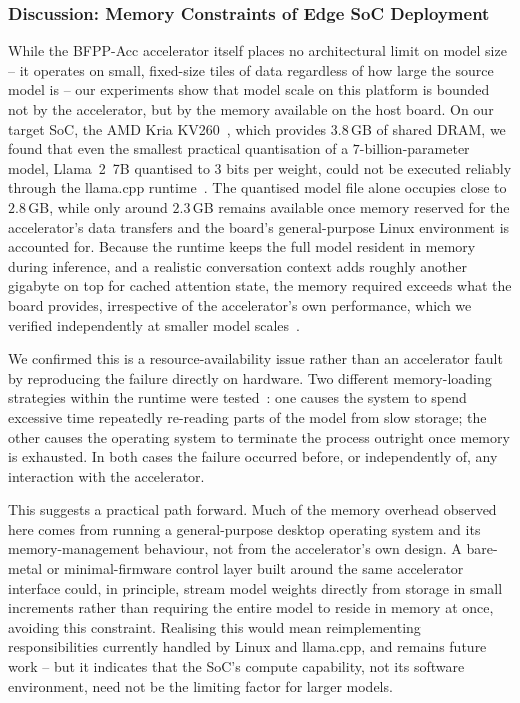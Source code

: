 \subsubsection{Discussion: Memory Constraints of Edge SoC Deployment}
\label{sec:discussion-memory-constraints}

While the BFPP-Acc accelerator itself places no architectural limit on model size -- it operates on small, fixed-size tiles of data regardless of how large the source model is -- our experiments show that model scale on this platform is bounded not by the accelerator, but by the memory available on the host board.
On our target SoC, the AMD Kria KV260~\cite{amdKriaKV260}, which provides $3.8$\,GB of shared DRAM, we found that even the smallest practical quantisation of a $7$-billion-parameter model, Llama~2~7B \cite{touvron2023llama2} quantised to $3$ bits per weight, could not be executed reliably through the llama.cpp runtime~\cite{LLP,GGML}.
The quantised model file alone occupies close to $2.8$\,GB, while only around $2.3$\,GB remains available once memory reserved for the accelerator's data transfers and the board's general-purpose Linux environment is accounted for.
Because the runtime keeps the full model resident in memory during inference, and a realistic conversation context adds roughly another gigabyte on top for cached attention state, the memory required exceeds what the board provides, irrespective of the accelerator's own performance, which we verified independently at smaller model scales~\cite{harisSECDAEfficientHardware2021}.

We confirmed this is a resource-availability issue rather than an accelerator fault by reproducing the failure directly on hardware.
Two different memory-loading strategies within the runtime were tested~\cite{kerrisk2010linux}: one causes the system to spend excessive time repeatedly re-reading parts of the model from slow storage; the other causes the operating system to terminate the process outright once memory is exhausted.
In both cases the failure occurred before, or independently of, any interaction with the accelerator.

This suggests a practical path forward.
Much of the memory overhead observed here comes from running a general-purpose desktop operating system and its memory-management behaviour, not from the accelerator's own design.
A bare-metal or minimal-firmware control layer built around the same accelerator interface could, in principle, stream model weights directly from storage in small increments rather than requiring the entire model to reside in memory at once, avoiding this constraint.
Realising this would mean reimplementing responsibilities currently handled by Linux and llama.cpp, and remains future work -- but it indicates that the SoC's compute capability, not its software environment, need not be the limiting factor for larger models.
